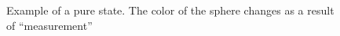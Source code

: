 \begin{figure}
\centering



\caption{Example of a pure state. The color of the sphere changes as a result of ``measurement''}
\label{figAddPureStateExample}
\end{figure}